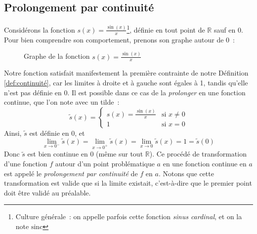 \subsection{Prolongement par continuité}
Considérons la fonction $s(x) = \frac{\sin(x)}{x}$\footnote{Culture générale~: on appelle parfois cette fonction \emph{sinus cardinal}, et on la note $\mathrm{sinc}$}, définie en tout point de $\mathbb{R}$ sauf en 0. Pour bien comprendre son comportement, prenons son graphe autour de 0~:
\begin{figure}[H]
    \centering
    \caption{Graphe de la fonction $s(x) = \frac{\sin(x)}{x}$}
    \label{fig:sin_over_x}
\end{figure}
Notre fonction satisfait manifestement la première contrainte de notre Définition \ref{def:continuité}, car les limites à droite et à gauche sont égales à 1, tandis qu'elle n'est pas définie en 0. Il est possible dans ce cas de la \emph{prolonger} en une fonction continue, que l'on note avec un tilde~:
\begin{equation}
\tilde{s}(x) = \begin{cases}
s(x) = \frac{\sin(x)}{x} & \textrm{si } x \neq 0 \\
1 & \textrm{si } x = 0
\end{cases}
\end{equation}
Ainsi, $\tilde{s}$ est définie en 0, et
\begin{equation}
\lim_{x \to 0^{-}} \tilde{s}(x) = \lim_{x \to 0^{+}} \tilde{s}(x) = \lim_{x \to 0} \tilde{s}(x) = 1 = \tilde{s}(0)
\end{equation}
Donc $\tilde{s}$ est bien continue en 0 (même sur tout $\mathbb{R}$). Ce procédé de transformation d'une fonction $f$ autour d'un point problématique $a$ en une fonction continue en $a$ est appelé le \emph{prolongement par continuité} de $f$ en $a$. Notons que cette transformation est valide que si la limite existait, c'est-à-dire que le premier point doit être validé au préalable.

